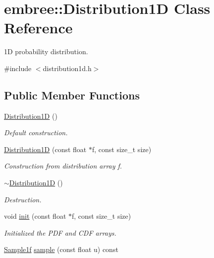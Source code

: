 \hypertarget{classembree_1_1_distribution1_d}{
\section{embree::Distribution1D Class Reference}
\label{classembree_1_1_distribution1_d}
}


1D probability distribution.  




{\ttfamily \#include $<$distribution1d.h$>$}

\subsection*{Public Member Functions}
\begin{DoxyCompactItemize}
\item 
\hyperlink{classembree_1_1_distribution1_d_aef24399abf0bc4c919f5bcaa0e8aae5b}{Distribution1D} ()
\begin{DoxyCompactList}\small\item\em Default construction. \item\end{DoxyCompactList}\item 
\hyperlink{classembree_1_1_distribution1_d_a3e7d5bdb62d200fa895f7a70d7e87068}{Distribution1D} (const float $\ast$f, const size\_\-t size)
\begin{DoxyCompactList}\small\item\em Construction from distribution array f. \item\end{DoxyCompactList}\item 
\hyperlink{classembree_1_1_distribution1_d_ac4ae0f1b2459c60af4468faa5fd0c24b}{$\sim$Distribution1D} ()
\begin{DoxyCompactList}\small\item\em Destruction. \item\end{DoxyCompactList}\item 
void \hyperlink{classembree_1_1_distribution1_d_a01e1d6f356833cdbf476c41e6fc25c1f}{init} (const float $\ast$f, const size\_\-t size)
\begin{DoxyCompactList}\small\item\em Initialized the PDF and CDF arrays. \item\end{DoxyCompactList}\item 
\hyperlink{structembree_1_1_sample}{Sample1f} \hyperlink{classembree_1_1_distribution1_d_ab91970cf11f35f2d4ebb95ed8fa48e6d}{sample} (const float u) const 

\end{DoxyCompactItemize}
